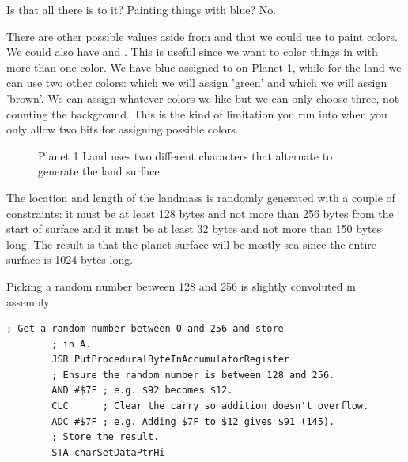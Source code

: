 Is that all there is to it? Painting things with blue? No. 

There are other possible values aside from  and  that we
could use to paint colors. We could also have  and . This
is useful since we want to color things in with more than one color. We have
blue assigned to  on Planet 1, while for the land we can use two
other colors:  which we will assign 'green' and  which we
will assign 'brown'. We can assign whatever colors we like but we can only
choose three, not counting the background. This is the kind of limitation you
run into when you only allow two bits for assigning possible colors.

\begin{figure}[H]
{
  \setlength{\tabcolsep}{3.0pt}
  \setlength\cmidrulewidth{\heavyrulewidth} %
    \begin{adjustbox}{width=10cm,center}
  \begin{subfigure}{0.3\textwidth}
  
  \end{subfigure}
  \begin{subfigure}{0.3\textwidth}
  
  \end{subfigure}
  \end{adjustbox}
}\caption[]{Planet 1 Land uses two different characters that alternate to generate the land surface.}
\end{figure}


The location and length of the landmass is randomly generated with a couple of constraints:
it must be at least 128 bytes  and not more than 256 bytes from the start of surface and it must be at least 32 bytes
and not more than 150 bytes long. The result is that the planet surface will be mostly sea
since the entire surface is 1024 bytes long.

Picking a random number between 128 and 256 is slightly convoluted in assembly:

\begin{lstlisting}[caption=Convoluted.]
        ; Get a random number between 0 and 256 and store
        ; in A.
        JSR PutProceduralByteInAccumulatorRegister
        ; Ensure the random number is between 128 and 256.
        AND #$7F ; e.g. $92 becomes $12.
        CLC      ; Clear the carry so addition doesn't overflow.
        ADC #$7F ; e.g. Adding $7F to $12 gives $91 (145).
        ; Store the result.
        STA charSetDataPtrHi
\end{lstlisting}

